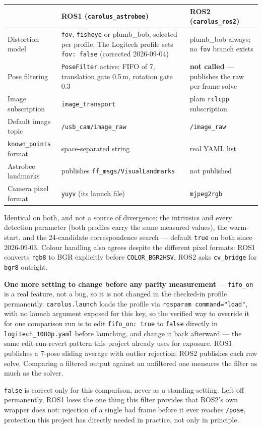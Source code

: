 \documentclass[11pt]{report}
\newenvironment{warningbox}%
  {\begin{lrbox}{\warnbox}\begin{minipage}{0.90\textwidth}}%
  {\end{minipage}\end{lrbox}%
   \begin{center}\fcolorbox{black}{codebg}{\usebox{\warnbox}}\end{center}}
\begin{document}
\begin{center}
\begin{tabular}{@{}p{}p{}p{}@{}}
\toprule
& ROS1 (\texttt{carolus\_astrobee}) & ROS2 (\texttt{carolus\_ros2}) \\
\midrule
Distortion model & \texttt{fov}, \texttt{fisheye} or plumb\_bob, selected per profile. The Logitech profile sets \texttt{fov: false} (corrected 2026-09-04) & plumb\_bob always; no \texttt{fov} branch exists \\
Pose filtering & \texttt{PoseFilter} active: FIFO of 7, translation gate 0.5\,m, rotation gate 0.3 & \textbf{not called} --- publishes the raw per-frame solve \\
Image subscription & \texttt{image\_transport} & plain \texttt{rclcpp} subscription \\
Default image topic & \texttt{/usb\_cam/image\_raw} & \texttt{/image\_raw} \\
\texttt{known\_points} format & space-separated string & real YAML list \\
Astrobee landmarks & publishes \texttt{ff\_msgs/VisualLandmarks} & not published \\
Camera pixel format & \texttt{yuyv} (its launch file) & \texttt{mjpeg2rgb} \\
\bottomrule
\end{tabular}
\end{center}

Identical on both, and not a source of divergence: the intrinsics and every
detection parameter (both profiles carry the same measured values), the
warm-start, and the 24-candidate correspondence search --- default
\texttt{true} on both since 2026-09-03. Colour handling also agrees despite
the different pixel formats: ROS1 converts \texttt{rgb8} to BGR explicitly
before \texttt{COLOR\_BGR2HSV}, ROS2 asks \texttt{cv\_bridge} for
\texttt{bgr8} outright.

\begin{warningbox}
\textbf{One more setting to change before any parity measurement} ---
\texttt{fifo\_on} is a real feature, not a bug, so it is not changed in the
checked-in profile permanently. \texttt{carolus.launch} loads the profile
via \texttt{rosparam command="load"}, with no launch argument exposed for
this key, so the verified way to override it for one comparison run is to
edit \texttt{fifo\_on: true} to \texttt{false} directly in
\texttt{logitech\_1080p.yaml} before launching, and change it back
afterward --- the same edit-run-revert pattern this project already uses for
exposure. ROS1 publishes a 7-pose sliding average with outlier rejection;
ROS2 publishes each raw solve. Comparing a filtered output against an
unfiltered one measures the filter as much as the solver.

\texttt{false} is correct only for this comparison, never as a standing
setting. Left off permanently, ROS1 loses the one thing this filter
provides that ROS2's own wrapper does not: rejection of a single bad frame
before it ever reaches \texttt{/pose}, protection this project has
directly needed in practice, not only in principle.
\end{warningbox}
\end{document}
